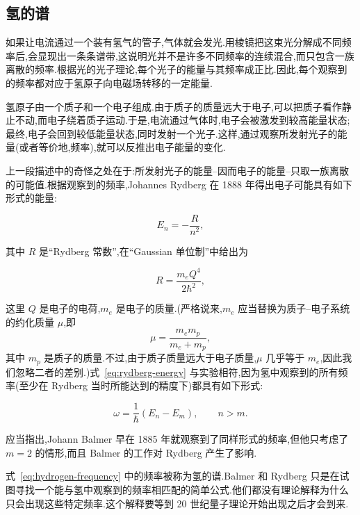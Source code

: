 \subsection{氢的谱}\label{subsec:hydrogen-spectrum}

如果让电流通过一个装有氢气的管子,气体就会发光.用棱镜把这束光分解成不同频率后,会显现出一条条谱带,这说明光并不是许多不同频率的连续混合,而只包含一族离散的频率.根据光的光子理论,每个光子的能量与其频率成正比.因此,每个观察到的频率都对应于氢原子向电磁场转移的一定能量.

氢原子由一个质子和一个电子组成.由于质子的质量远大于电子,可以把质子看作静止不动,而电子绕着质子运动.于是,电流通过气体时,电子会被激发到较高能量状态;最终,电子会回到较低能量状态,同时发射一个光子.这样,通过观察所发射光子的能量(或者等价地,频率),就可以反推出电子能量的变化.

上一段描述中的奇怪之处在于:所发射光子的能量--因而电子的能量--只取一族离散的可能值.根据观察到的频率,Johannes Rydberg 在 1888 年得出电子可能具有如下形式的能量:

\begin{equation}
  E_n=-\frac{R}{n^2},\label{eq:rydberg-energy}
\end{equation}

其中 $R$ 是“Rydberg 常数”,在“Gaussian 单位制”中给出为

\begin{equation}
  R=\frac{m_e Q^4}{2\hbar^2},\label{eq:rydberg-constant}
\end{equation}

这里 $Q$ 是电子的电荷,$m_e$ 是电子的质量.(严格说来,$m_e$ 应当替换为质子--电子系统的约化质量 $\mu$,即
\[
  \mu=\frac{m_e m_p}{m_e+m_p},
\]
其中 $m_p$ 是质子的质量.不过,由于质子质量远大于电子质量,$\mu$ 几乎等于 $m_e$,因此我们忽略二者的差别.)式~\eqref{eq:rydberg-energy} 与实验相符,因为氢中观察到的所有频率(至少在 Rydberg 当时所能达到的精度下)都具有如下形式:

\begin{equation}
  \omega=\frac{1}{\hbar}(E_n-E_m),\qquad n>m.\label{eq:hydrogen-frequency}
\end{equation}

应当指出,Johann Balmer 早在 1885 年就观察到了同样形式的频率,但他只考虑了 $m=2$ 的情形,而且 Balmer 的工作对 Rydberg 产生了影响.

式~\eqref{eq:hydrogen-frequency} 中的频率被称为氢的谱.Balmer 和 Rydberg 只是在试图寻找一个能与氢中观察到的频率相匹配的简单公式.他们都没有理论解释为什么只会出现这些特定频率.这个解释要等到 20 世纪量子理论开始出现之后才会到来.

